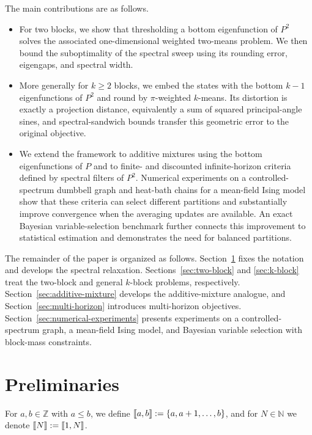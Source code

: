 \documentclass[11pt]{article}
\newcommand{\1}{\mathbf{1}}
\providecommand{\llbracket}{\mathopen{[\mkern-2.7mu[}}
\providecommand{\rrbracket}{\mathclose{]\mkern-2.7mu]}}
\begin{document}
The main contributions are as follows.

\begin{itemize}
    \item For two blocks, we show that thresholding a bottom
    eigenfunction of $P^2$ solves the associated one-dimensional
    weighted two-means problem.  We then bound the suboptimality of the
    spectral sweep using its rounding error, eigengaps, and spectral
    width.

    \item More generally for $k \geq 2$ blocks, we embed the states with the bottom $k-1$
    eigenfunctions of $P^2$ and round by $\pi$-weighted $k$-means.  Its
    distortion is exactly a projection distance, equivalently a sum
    of squared principal-angle sines, and spectral-sandwich bounds
    transfer this geometric error to the original objective.

    \item We extend the framework to additive mixtures using the
    bottom eigenfunctions of $P$ and to finite- and discounted
    infinite-horizon criteria defined by spectral filters of $P^2$. Numerical experiments on a controlled-spectrum dumbbell graph and heat-bath chains for a mean-field Ising model show that these
    criteria can select different partitions and substantially improve
    convergence when the averaging updates are available.  An exact
    Bayesian variable-selection benchmark further connects this
    improvement to statistical estimation and demonstrates the need
    for balanced partitions.
\end{itemize}

The remainder of the paper is organized as follows.
Section~\ref{sec:preliminaries} fixes the notation and develops the
spectral relaxation.  Sections~\ref{sec:two-block} and
\ref{sec:k-block} treat the two-block and general $k$-block problems,
respectively.  Section~\ref{sec:additive-mixture} develops the
additive-mixture analogue, and Section~\ref{sec:multi-horizon}
introduces multi-horizon objectives.  Section~\ref{sec:numerical-experiments}
presents experiments on a controlled-spectrum graph, a mean-field
Ising model, and Bayesian variable selection with block-mass
constraints.

\section{Preliminaries}
\label{sec:preliminaries}

For $a,b\in\mathbb Z$ with $a\leq b$, we define
$\llbracket a,b\rrbracket:=\{a,a+1,\ldots,b\}$, and for
$N\in\mathbb N$ we denote
$\llbracket N\rrbracket:=\llbracket 1,N\rrbracket$.
\end{document}
